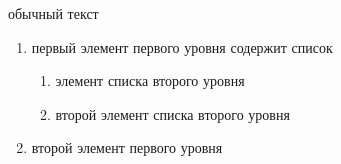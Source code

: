 \tableofcontents %

обычный текст

\begin{enumerate} 
    \item первый элемент первого уровня содержит список 
      \begin{enumerate} 
          \item элемент списка второго уровня
          \item второй элемент списка второго уровня
      \end{enumerate} 
    \item  второй элемент первого уровня
  \end{enumerate}


\clearpage
